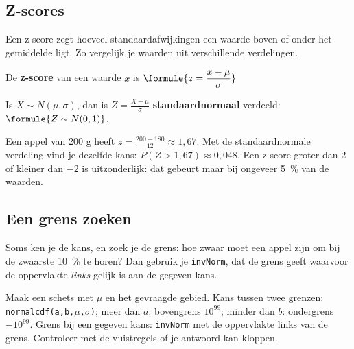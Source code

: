 \subsection{Z-scores}

Een z-score zegt hoeveel standaardafwijkingen een waarde boven of onder het gemiddelde ligt. Zo vergelijk je waarden uit verschillende verdelingen.

\begin{theorie}
De \textbf{\textcolor{accent}{z-score}} van een waarde $x$ is \quad $\formule{z = \dfrac{x - \mu}{\sigma}}$

\vspace{1mm}
Is $X \sim N(\mu, \sigma)$, dan is $Z = \frac{X - \mu}{\sigma}$ \textbf{\textcolor{accent}{standaardnormaal}} verdeeld: $\formule{Z \sim N(0, 1)}$.
\end{theorie}

Een appel van 200 g heeft $z = \frac{200 - 180}{12} \approx 1{,}67$. Met de standaardnormale verdeling vind je dezelfde kans: $P(Z > 1{,}67) \approx 0{,}048$. Een z-score groter dan 2 of kleiner dan $-2$ is uitzonderlijk: dat gebeurt maar bij ongeveer 5~\% van de waarden.

\begin{oefeningen}
\end{oefeningen}

\subsection{Een grens zoeken}

Soms ken je de kans, en zoek je de grens: hoe zwaar moet een appel zijn om bij de zwaarste 10~\% te horen? Dan gebruik je \texttt{invNorm}, dat de grens geeft waarvoor de oppervlakte \textit{links} gelijk is aan de gegeven kans.


\begin{werkwijze}
Maak een schets met $\mu$ en het gevraagde gebied. Kans tussen twee grenzen: \texttt{normalcdf(a,b,$\mu$,$\sigma$)}; meer dan $a$: bovengrens $10^{99}$; minder dan $b$: ondergrens $-10^{99}$. Grens bij een gegeven kans: \texttt{invNorm} met de oppervlakte links van de grens. Controleer met de vuistregels of je antwoord kan kloppen.
\end{werkwijze}


